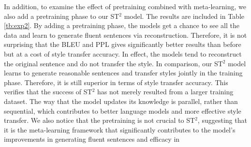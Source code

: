 In addition, to examine the effect of pretraining combined with meta-learning, we also add a pretraining phase to our ST$^2$ model. The results are included in Table \ref{tb:exp2}.
By adding a pretraining phase, the models get a chance to see all the data and learn to generate fluent sentences via reconstruction. Therefore, it is not surprising that the BLEU and PPL gives significantly better results than before but at a cost of style transfer accuracy. In effect, the models tend to reconstruct the original sentence and do not transfer the style. In comparison, our ST$^2$ model learns to generate reasonable sentences and transfer styles jointly in the training phase. Therefore, it is still superior in terms of style transfer accuracy. This verifies that the success of ST$^2$ has not merely resulted from a larger training dataset. The way that the model updates its knowledge is parallel, rather than sequential, which contributes to better language models and more effective style transfer. We also notice that the pretraining is not crucial to ST$^2$, suggesting that it is the meta-learning framework that significantly contributes to the model's improvements in generating fluent sentences and efficacy in
